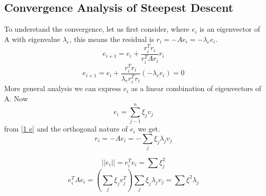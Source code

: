 \subsection{Convergence Analysis of Steepest Descent}
To understand the convergence, let us first consider, where $e_i$ is an eigenvector of A
with eigenvalue $\lambda_e$, this means the residual is $r_i=-Ae_i=-\lambda_e e_i$.
\[e_{i+1} = e_{i} +\frac{r_i^Tr_i}{r_i^TAr_i}r_i \]
\[e_{i+1} = e_{i} +\frac{r_i^Tr_i}{\lambda_er_i^Tr_i}(-\lambda_e e_i)=0 \]
More general analysis we can express $e_i$ as a linear combination of eigenvectors of A.
Now
\begin{equation}
\label{1 e}
e_i = \sum_{j-1}^{n} \xi_jv_j
\end{equation}
from \ref{1 e} and the orthogonal nature of $e_i$ we get.
\begin{equation}
\label{2 e}
r_i = -Ae_i = - \sum_{j} \xi_j \lambda_j v_j
\end{equation}

\begin{equation}
||e_i|| = e_i^Te_i = \sum \xi_j^2
\end{equation}
\begin{equation}
e^T_iAe_i =( \sum_j \xi_j v_j^T) \sum_j \xi_j \lambda_j v_j = \sum \xi^2 \lambda_j 
\end{equation}

